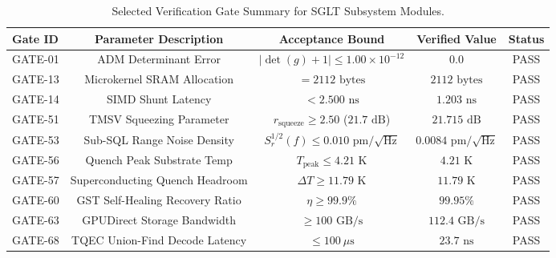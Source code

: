 \documentclass[10pt,twocolumn]{IEEEtran}
\begin{document}
\begin{table}[!ht]
\centering
\caption{Selected Verification Gate Summary for SGLT Subsystem Modules.}
\label{tab:verification_gates_summary}
\begin{tabular}{lcccc}
\hline
\textbf{Gate ID} & \textbf{Parameter Description} & \textbf{Acceptance Bound} & \textbf{Verified Value} & \textbf{Status} \\ \hline
GATE-01 & ADM Determinant Error & $\vert{}\det(g) + 1\vert{} \le 1.00 \times 10^{-12}$ & $0.0$ & PASS \\
GATE-13 & Microkernel SRAM Allocation & $= 2112\text{ bytes}$ & $2112\text{ bytes}$ & PASS \\
GATE-14 & SIMD Shunt Latency & $< 2.500\text{ ns}$ & $1.203\text{ ns}$ & PASS \\
GATE-51 & TMSV Squeezing Parameter & $r_{\text{squeeze}} \ge 2.50$ ($21.7\text{ dB}$) & $21.715\text{ dB}$ & PASS \\
GATE-53 & Sub-SQL Range Noise Density & $S_r^{1/2}(f) \le 0.010\text{ pm}/\sqrt{\text{Hz}}$ & $0.0084\text{ pm}/\sqrt{\text{Hz}}$ & PASS \\
GATE-56 & Quench Peak Substrate Temp & $T_{\text{peak}} \le 4.21\text{ K}$ & $4.21\text{ K}$ & PASS \\
GATE-57 & Superconducting Quench Headroom & $\Delta T \ge 11.79\text{ K}$ & $11.79\text{ K}$ & PASS \\
GATE-60 & GST Self-Healing Recovery Ratio & $\eta \ge 99.9\%$ & $99.95\%$ & PASS \\
GATE-63 & GPUDirect Storage Bandwidth & $\ge 100\text{ GB/s}$ & $112.4\text{ GB/s}$ & PASS \\
GATE-68 & TQEC Union-Find Decode Latency & $\le 100\ \mu\text{s}$ & $23.7\text{ ns}$ & PASS \\ \hline
\end{tabular}
\end{table}
\end{document}

